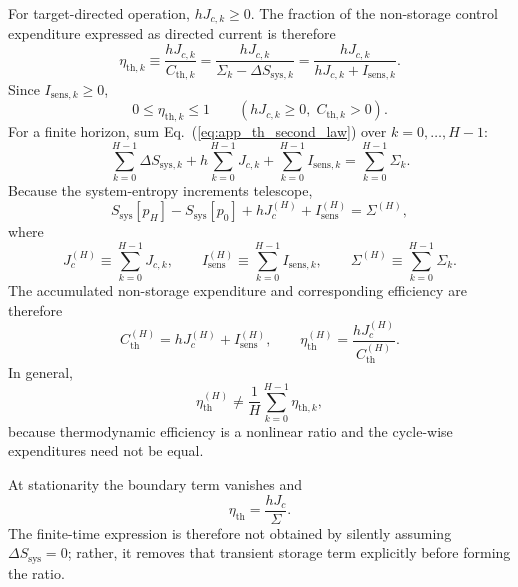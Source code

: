 For target-directed operation, $hJ_{c,k}\ge0$. The fraction of the non-storage
control expenditure expressed as directed current is therefore
\begin{equation}
\boxed{
\eta_{\mathrm{th},k}
\equiv
\frac{hJ_{c,k}}{C_{\mathrm{th},k}}
=
\frac{hJ_{c,k}}{\Sigma_k-\Delta S_{\mathrm{sys},k}}
=
\frac{hJ_{c,k}}{hJ_{c,k}+I_{\mathrm{sens},k}}.}
\label{eq:app_th_efficiency}
\end{equation}
Since $I_{\mathrm{sens},k}\ge0$,
\begin{equation}
0\le\eta_{\mathrm{th},k}\le1
\qquad
(hJ_{c,k}\ge0,\; C_{\mathrm{th},k}>0).
\label{eq:app_th_efficiency_bound}
\end{equation}
For a finite horizon, sum Eq.~(\ref{eq:app_th_second_law}) over
$k=0,\ldots,H-1$:
\begin{equation}
\sum_{k=0}^{H-1}\Delta S_{\mathrm{sys},k}
+h\sum_{k=0}^{H-1}J_{c,k}
+\sum_{k=0}^{H-1}I_{\mathrm{sens},k}
=\sum_{k=0}^{H-1}\Sigma_k.
\label{eq:app_th_horizon_sum}
\end{equation}
Because the system-entropy increments telescope,
\begin{equation}
S_{\mathrm{sys}}[p_H]-S_{\mathrm{sys}}[p_0]
+hJ_c^{(H)}+I_{\mathrm{sens}}^{(H)}
=\Sigma^{(H)},
\label{eq:app_th_horizon_identity}
\end{equation}
where
\begin{equation}
J_c^{(H)}\equiv\sum_{k=0}^{H-1}J_{c,k},\qquad
I_{\mathrm{sens}}^{(H)}\equiv\sum_{k=0}^{H-1}I_{\mathrm{sens},k},\qquad
\Sigma^{(H)}\equiv\sum_{k=0}^{H-1}\Sigma_k.
\label{eq:app_th_horizon_quantities}
\end{equation}
The accumulated non-storage expenditure and corresponding efficiency are
therefore
\begin{equation}
C_{\mathrm{th}}^{(H)}
=hJ_c^{(H)}+I_{\mathrm{sens}}^{(H)},
\qquad
\eta_{\mathrm{th}}^{(H)}
=\frac{hJ_c^{(H)}}{C_{\mathrm{th}}^{(H)}}.
\label{eq:app_th_horizon_efficiency}
\end{equation}
In general,
\begin{equation}
\eta_{\mathrm{th}}^{(H)}
\ne
\frac{1}{H}\sum_{k=0}^{H-1}\eta_{\mathrm{th},k},
\label{eq:app_th_not_mean_efficiency}
\end{equation}
because thermodynamic efficiency is a nonlinear ratio and the cycle-wise
expenditures need not be equal.

At stationarity the boundary term vanishes and
\begin{equation}
\eta_{\mathrm{th}}
=\frac{hJ_c}{\Sigma}.
\label{eq:app_th_stationary_efficiency}
\end{equation}
The finite-time expression is therefore not obtained by silently assuming
$\Delta S_{\mathrm{sys}}=0$; rather, it removes that transient storage term
explicitly before forming the ratio.

